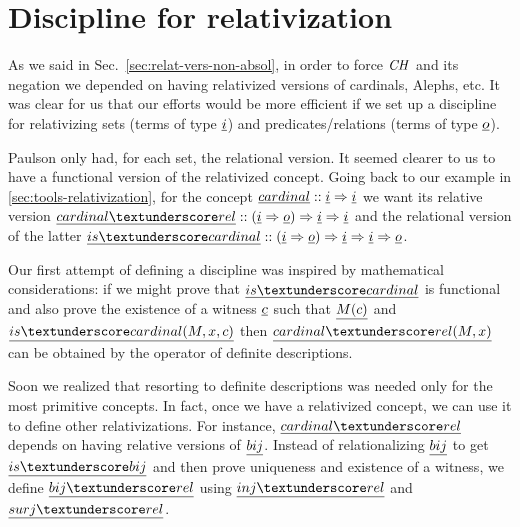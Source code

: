 \section{Discipline for relativization}
\label{sec:discipline-relativization}

As we said in Sec.~\ref{sec:relat-vers-non-absol}, in order to force
$\mathit{CH}$ and its negation we depended on having relativized versions of
cardinals, Alephs, etc. It was clear for us that our efforts would be
more efficient if we set up a discipline for relativizing sets (terms
of type $\tyi$) and predicates/relations (terms of type $\tyo$).

Paulson only had, for each set, the relational version. It seemed
clearer to us to have a functional version of the relativized concept.
Going back to our example in \ref{sec:tools-relativization}, for the
concept $\isa{cardinal}::\tyi \fun \tyi$ we want its relative
version
$\isa{cardinal{\uscore}rel}::(\tyi \fun \tyo) \fun \tyi \fun\tyi$
and the relational version of the latter
$\isa{is{\uscore}cardinal}::(\tyi \fun \tyo) \fun \tyi \fun \tyi
\fun \tyo$.

Our first attempt of defining a discipline was inspired by
mathematical considerations: if we might prove that
$\isa{is{\uscore}cardinal}$ is functional and also prove the
existence of a witness $\isa{c}$ such that $\isa{M(c)}$ and
$\isa{is{\uscore}cardinal(M,x,c)}$ then
$\isa{cardinal{\uscore}rel(M,x)}$ can be obtained by the operator of
definite descriptions.

Soon we realized that resorting to definite descriptions was needed
only for the most primitive concepts. In fact, once we have a
relativized concept, we can use it to define other relativizations.
For instance, $\isa{cardinal{\uscore}rel}$ depends on having
relative versions of $\isa{bij}$. Instead of relationalizing
$\isa{bij}$ to get $\isa{is{\uscore}bij}$ and then prove
uniqueness and existence of a witness, we define
$\isa{bij{\uscore}rel}$ using $\isa{inj{\uscore}rel}$ and
$\isa{surj{\uscore}rel}$.

